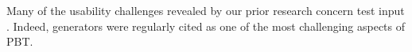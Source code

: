 



Many of the usability challenges revealed by our prior research concern test input
.
Indeed, generators were regularly cited as one of the most challenging
aspects of PBT.

